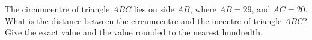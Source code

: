 The circumcentre of triangle $ABC$ lies on side $\overline{AB}$, where $AB=29$, and $AC=20$. What is the distance between the circumcentre and the incentre of triangle $ABC$? Give the exact value and the value rounded to the nearest hundredth.
